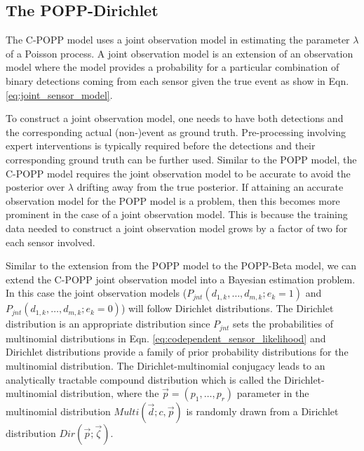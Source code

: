 
\subsection{The POPP-Dirichlet}
\label{subsec:popd}

The C-POPP model uses a joint observation model in estimating the parameter $\lambda$ of a Poisson process. A joint observation model is an extension of an observation model where the model provides a probability for a particular combination of binary detections coming from each sensor given the true event as show in Eqn. \ref{eq:joint_sensor_model}.

To construct a joint observation model, one needs to have both detections and the corresponding actual (non-)event as ground truth. Pre-processing involving expert interventions is typically required before the detections and their corresponding ground truth can be further used. Similar to the POPP model, the C-POPP model requires the joint observation model to be accurate to avoid the posterior over $\lambda$ drifting away from the true posterior. If attaining an accurate observation model for the POPP model is a problem, then this becomes more prominent in the case of a joint observation model. This is because the training data needed to construct a joint observation model grows by a factor of two for each sensor involved.       

Similar to the extension from the POPP model to the POPP-Beta model, we can extend the C-POPP joint observation model into a Bayesian estimation problem. In this case the joint observation models ($P_{jnt}(d_{1,k}, \ldots, d_{m,k} ; e_k = 1)$ and $P_{jnt}(d_{1,k}, \ldots, d_{m,k} ; e_k = 0)$) will follow Dirichlet distributions. The Dirichlet distribution is an appropriate distribution since $P_{jnt}$ sets the probabilities of multinomial distributions in Eqn. \ref{eq:codependent_sensor_likelihood} and Dirichlet distributions provide a family of prior probability distributions for the multinomial distribution. The Dirichlet-multinomial conjugacy leads to an analytically tractable compound distribution which is called the Dirichlet-multinomial distribution, where the $\vec{p} = (p_1, \ldots, p_r)$ parameter in the multinomial distribution $Multi(\vec{d} ; c, \vec{p})$ is randomly drawn from a Dirichlet distribution $Dir(\vec{p} ; \vec{\zeta})$. 

